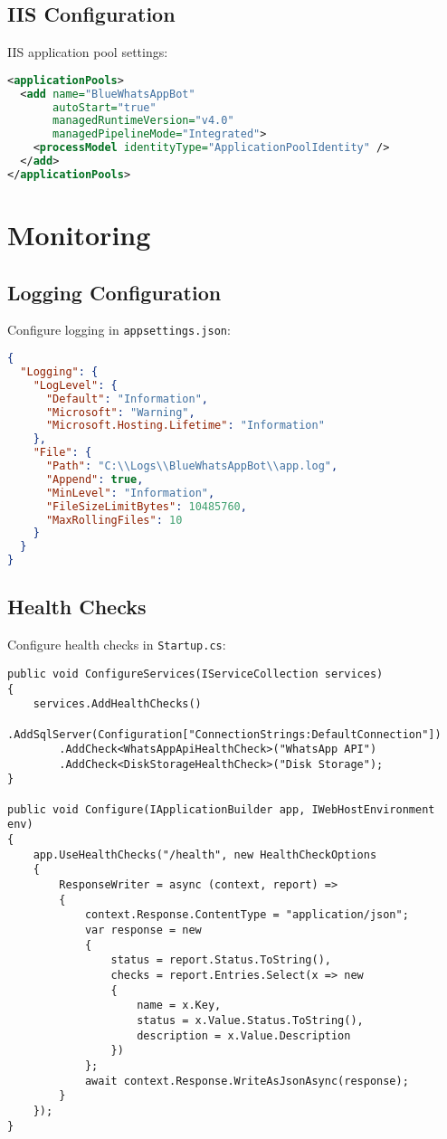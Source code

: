 \subsection{IIS Configuration}
IIS application pool settings:

\begin{lstlisting}[language=xml]
<applicationPools>
  <add name="BlueWhatsAppBot" 
       autoStart="true" 
       managedRuntimeVersion="v4.0" 
       managedPipelineMode="Integrated">
    <processModel identityType="ApplicationPoolIdentity" />
  </add>
</applicationPools>
\end{lstlisting}

\section{Monitoring}

\subsection{Logging Configuration}
Configure logging in \texttt{appsettings.json}:

\begin{lstlisting}[language=json]
{
  "Logging": {
    "LogLevel": {
      "Default": "Information",
      "Microsoft": "Warning",
      "Microsoft.Hosting.Lifetime": "Information"
    },
    "File": {
      "Path": "C:\\Logs\\BlueWhatsAppBot\\app.log",
      "Append": true,
      "MinLevel": "Information",
      "FileSizeLimitBytes": 10485760,
      "MaxRollingFiles": 10
    }
  }
}
\end{lstlisting}

\subsection{Health Checks}
Configure health checks in \texttt{Startup.cs}:

\begin{lstlisting}[language=CSharp]
public void ConfigureServices(IServiceCollection services)
{
    services.AddHealthChecks()
        .AddSqlServer(Configuration["ConnectionStrings:DefaultConnection"])
        .AddCheck<WhatsAppApiHealthCheck>("WhatsApp API")
        .AddCheck<DiskStorageHealthCheck>("Disk Storage");
}

public void Configure(IApplicationBuilder app, IWebHostEnvironment env)
{
    app.UseHealthChecks("/health", new HealthCheckOptions
    {
        ResponseWriter = async (context, report) =>
        {
            context.Response.ContentType = "application/json";
            var response = new
            {
                status = report.Status.ToString(),
                checks = report.Entries.Select(x => new
                {
                    name = x.Key,
                    status = x.Value.Status.ToString(),
                    description = x.Value.Description
                })
            };
            await context.Response.WriteAsJsonAsync(response);
        }
    });
}
\end{lstlisting}

